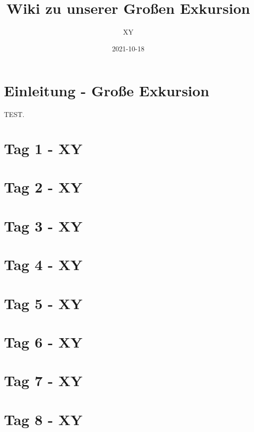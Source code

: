 \documentclass[
]{book}
\title{Wiki zu unserer Großen Exkursion}
\author{XY}
\date{2021-10-18}
\begin{document}
\maketitle

{
\setcounter{tocdepth}{1}
\tableofcontents
}
\hypertarget{einleitung---grouxdfe-exkursion}{%
\chapter{Einleitung - Große Exkursion}\label{einleitung---grouxdfe-exkursion}}

TEST.

\hypertarget{tag-1---xy}{%
\chapter{Tag 1 - XY}\label{tag-1---xy}}

\hypertarget{tag-2---xy}{%
\chapter{Tag 2 - XY}\label{tag-2---xy}}

\hypertarget{tag-3---xy}{%
\chapter{Tag 3 - XY}\label{tag-3---xy}}

\hypertarget{tag-4---xy}{%
\chapter{Tag 4 - XY}\label{tag-4---xy}}

\hypertarget{tag-5---xy}{%
\chapter{Tag 5 - XY}\label{tag-5---xy}}

\hypertarget{tag-6---xy}{%
\chapter{Tag 6 - XY}\label{tag-6---xy}}

\hypertarget{tag-7---xy}{%
\chapter{Tag 7 - XY}\label{tag-7---xy}}

\hypertarget{tag-8---xy}{%
\chapter{Tag 8 - XY}\label{tag-8---xy}}
\end{document}
